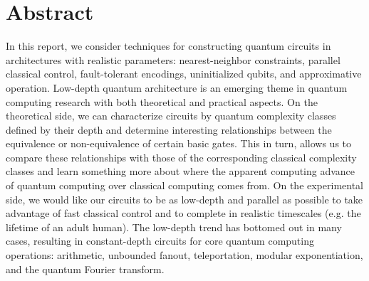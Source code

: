 \section{Abstract}

In this report, we consider techniques for constructing
quantum circuits in architectures with realistic
parameters: nearest-neighbor constraints, parallel classical control,
fault-tolerant encodings, uninitialized qubits, and approximative operation.
Low-depth quantum architecture is an emerging
theme in quantum computing research with both theoretical and
practical aspects. On the theoretical side, we can characterize
circuits by quantum complexity classes defined by their depth and determine
interesting relationships between the equivalence or non-equivalence
of certain basic gates. This in turn, allows us to compare these
relationships with those of the corresponding classical complexity classes
and learn something more about where the apparent computing advance of quantum
computing over classical computing comes from. On the experimental side,
we would like our circuits to be as low-depth and parallel as possible
to take advantage of fast classical control and to complete in realistic
timescales (e.g. the lifetime of an adult human). The low-depth trend has
bottomed out in many cases, resulting in constant-depth circuits
for core quantum computing operations: arithmetic, unbounded
fanout, teleportation, modular exponentiation, and the quantum Fourier transform.
